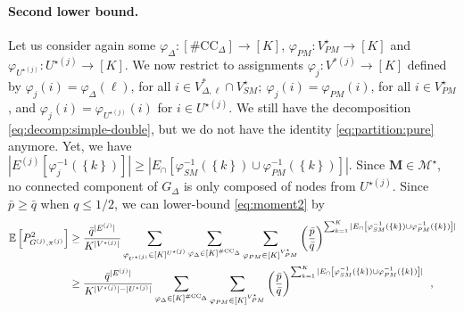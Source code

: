 \documentclass[final]{colt2026}
\newcommand{\1}{\mathbf{1}}
\newcommand{\ch}[1]{\textcolor{green}{#1}}
\newcommand{\bbE}{\mathbb{E}}
\newcommand{\pa}[1]{\left(#1\right)}
\newcommand{\ac}[1]{\left\{#1\right\}}
\newcommand{\cro}[1]{\left[#1\right]}
\begin{document}
\paragraph{Second lower bound.} 
Let us consider again some $\varphi_{\Delta}:[\#\mathrm{CC}_{\Delta}]\to[K]$,  $\varphi_{PM}:V^{\star}_{PM}\to [K]$ and $\varphi_{U^{\star(j)}}: U^{\star(j)}\to [K]$.
We now restrict to assignments 
 $\varphi_{j}:V^{*(j)}\to[K]$ defined by $\varphi_j(i)=\varphi_{\Delta}(\ell)$, for all $i\in V^{*}_{\Delta,\ell}\cap V^{\star}_{SM};\ \varphi_j(i)=\varphi_{PM}(i)$, for all $i\in V^{\star}_{PM}$, and $\varphi_j(i)=\varphi_{U^{\star(j)}}(i)$ for $i\in U^{\star(j)}$.
We still have the decomposition \eqref{eq:decomp:simple-double}, but we do not have the identity \eqref{eq:partition:pure} anymore. 
Yet, we have $\left|E^{(j)}\cro{\varphi_{j}^{-1}(\ac{k})}\right| \geq \left| E_{\cap}\cro{\varphi_{SM}^{-1}(\ac{k})\cup\varphi_{PM}^{-1}(\ac{k})}\right|$. Since $\mathbf{M}\in\mathcal{M}^\star$, no connected component of $G_{\Delta}$ is only composed of nodes from $U^{\star(j)}$. 
Since $\bar p \geq \bar q$ when $q\leq 1/2$,  we can lower-bound \eqref{eq:moment2} by
\begin{align}
\bbE\cro{P_{G^{(j)}, \pi^{(j)}}^2} & \geq  {\bar q^{|E^{(j)}|}\over K^{|V^{\star(j)}|}} \nonumber
\sum_{\varphi_{U^{\star(j)}}\in [K]^{U^{\star(j)}}} \sum_{\varphi_{\Delta}\in [K]^{\#\mathrm{CC}_{\Delta}}} \sum_{\varphi_{PM}\in [K]^{V^{\star}_{PM}}}  \pa{\bar p\over \bar q}^{\sum_{k=1}^K|E_{\cap}\cro{\varphi_{SM}^{-1}(\ac{k})\cup\varphi_{PM}^{-1}(\ac{k})}|}\\
& \geq  {\bar q^{|E^{(j)}|}\over K^{|V^{\star(j)}|-|U^{\star(j)}|}}   \sum_{\varphi_{\Delta}\in [K]^{\#\mathrm{CC}_{\Delta}}} \sum_{\varphi_{PM}\in [K]^{V^{\star}_{PM}}}  \pa{\bar p\over \bar q}^{\sum_{k=1}^K|E_{\cap}\cro{\varphi_{SM}^{-1}(\ac{k})\cup\varphi_{PM}^{-1}(\ac{k})}|}\enspace , \nonumber
\end{align}
\end{document}
